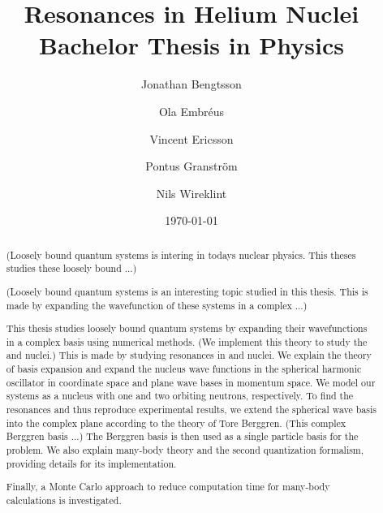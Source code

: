 \documentclass[12pt,a4paper]{report}
\begin{document}
  

\listoftodos


\title{Resonances in Helium Nuclei\\ 
\Large Bachelor Thesis in Physics}
\author{Jonathan Bengtsson \and Ola Embréus \and Vincent Ericsson \and Pontus Granström \and Nils Wireklint}
\date{\today}



\maketitle

\newpage
\begin{abstract}
(Loosely bound quantum systems is intering in todays nuclear physics. This theses studies these loosely bound ...)

(Loosely bound quantum systems is an interesting topic studied in this thesis. This is made by expanding the wavefunction of these systems in a complex ...)

This thesis studies loosely bound quantum systems by expanding their wavefunctions in a complex basis using numerical methods. 
(We implement this theory to study the  and  nuclei.)
This is made by studying
resonances in  and  nuclei. We explain the theory of basis
expansion and expand the  nucleus wave functions in the spherical harmonic oscillator in coordinate space
and plane wave bases in momentum space. We model our systems as a  nucleus with one and two orbiting neutrons, respectively.
To find the resonances and thus reproduce experimental results, we extend the spherical wave basis into the complex plane according to the 
theory of Tore Berggren. 
(This complex Berggren basis ...) The Berggren basis is then used as a single particle
basis for the  problem. 
We also explain many-body theory and the second quantization formalism, providing details for its implementation.

Finally, a Monte Carlo approach to reduce computation time for many-body calculations is investigated.

\end{abstract}
\newpage
\end{document}
